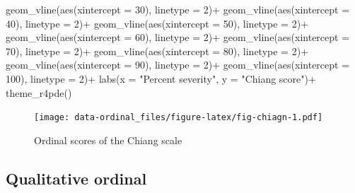 \documentclass[
  letterpaper,
]{book}
\newenvironment{Shaded}{\begin{snugshade}}{\end{snugshade}}
\newcommand{\AttributeTok}[1]{\textcolor[rgb]{0.40,0.45,0.13}{#1}}
\newcommand{\DecValTok}[1]{\textcolor[rgb]{0.68,0.00,0.00}{#1}}
\newcommand{\FunctionTok}[1]{\textcolor[rgb]{0.28,0.35,0.67}{#1}}
\newcommand{\NormalTok}[1]{\textcolor[rgb]{0.00,0.23,0.31}{#1}}
\newcommand{\SpecialCharTok}[1]{\textcolor[rgb]{0.37,0.37,0.37}{#1}}
\newcommand{\StringTok}[1]{\textcolor[rgb]{0.13,0.47,0.30}{#1}}
\begin{document}
\begin{Shaded}
\begin{Highlighting}[]
  \FunctionTok{geom\_vline}\NormalTok{(}\FunctionTok{aes}\NormalTok{(}\AttributeTok{xintercept =} \DecValTok{30}\NormalTok{), }\AttributeTok{linetype =} \DecValTok{2}\NormalTok{)}\SpecialCharTok{+}
   \FunctionTok{geom\_vline}\NormalTok{(}\FunctionTok{aes}\NormalTok{(}\AttributeTok{xintercept =} \DecValTok{40}\NormalTok{), }\AttributeTok{linetype =} \DecValTok{2}\NormalTok{)}\SpecialCharTok{+}
   \FunctionTok{geom\_vline}\NormalTok{(}\FunctionTok{aes}\NormalTok{(}\AttributeTok{xintercept =} \DecValTok{50}\NormalTok{), }\AttributeTok{linetype =} \DecValTok{2}\NormalTok{)}\SpecialCharTok{+}
   \FunctionTok{geom\_vline}\NormalTok{(}\FunctionTok{aes}\NormalTok{(}\AttributeTok{xintercept =} \DecValTok{60}\NormalTok{), }\AttributeTok{linetype =} \DecValTok{2}\NormalTok{)}\SpecialCharTok{+}
   \FunctionTok{geom\_vline}\NormalTok{(}\FunctionTok{aes}\NormalTok{(}\AttributeTok{xintercept =} \DecValTok{70}\NormalTok{), }\AttributeTok{linetype =} \DecValTok{2}\NormalTok{)}\SpecialCharTok{+}
   \FunctionTok{geom\_vline}\NormalTok{(}\FunctionTok{aes}\NormalTok{(}\AttributeTok{xintercept =} \DecValTok{80}\NormalTok{), }\AttributeTok{linetype =} \DecValTok{2}\NormalTok{)}\SpecialCharTok{+}
   \FunctionTok{geom\_vline}\NormalTok{(}\FunctionTok{aes}\NormalTok{(}\AttributeTok{xintercept =} \DecValTok{90}\NormalTok{), }\AttributeTok{linetype =} \DecValTok{2}\NormalTok{)}\SpecialCharTok{+}
   \FunctionTok{geom\_vline}\NormalTok{(}\FunctionTok{aes}\NormalTok{(}\AttributeTok{xintercept =} \DecValTok{100}\NormalTok{), }\AttributeTok{linetype =} \DecValTok{2}\NormalTok{)}\SpecialCharTok{+}
  \FunctionTok{labs}\NormalTok{(}\AttributeTok{x =} \StringTok{"Percent severity"}\NormalTok{, }\AttributeTok{y =} \StringTok{"Chiang score"}\NormalTok{)}\SpecialCharTok{+}
  \FunctionTok{theme\_r4pde}\NormalTok{()}
\end{Highlighting}
\end{Shaded}

\begin{figure}

\texttt{[image: data-ordinal\_files/figure-latex/fig-chiagn-1.pdf]} \hfill{}

\caption{\label{fig-chiagn}Ordinal scores of the Chiang scale}

\end{figure}

\hypertarget{qualitative-ordinal}{%
\subsection{Qualitative ordinal}\label{qualitative-ordinal}}
\end{document}
